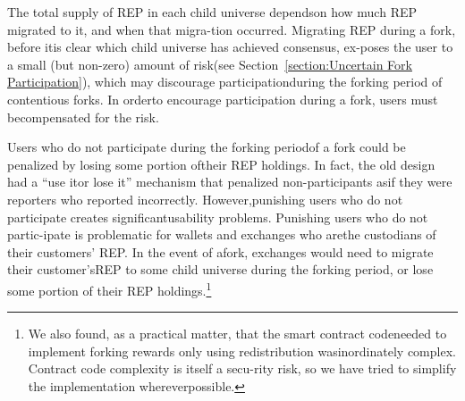 \documentclass[12pt,floatfix,reprint,nofootinbib,amsmath,amssymb,epsfig,pre,floats,letterpaper,groupedaffiliation]{revtex4-1}
\theoremstyle{definition}
\theoremstyle{definition}
\begin{document}
The total supply of REP in each child universe depends\linebreak on how much REP migrated to it, and when that migra-\linebreak tion occurred. Migrating REP during a fork, before it\linebreak is clear which child universe has achieved consensus, ex-\linebreak poses the user to a small (but non-zero) amount of risk\linebreak (see Section~\ref{section:Uncertain Fork Participation}), which may discourage participation\linebreak during the forking period of contentious forks. In order\linebreak to encourage participation during a fork, users must be\linebreak compensated for the risk.

Users who do not participate during the forking period\linebreak of a fork could be penalized by losing some portion of\linebreak their REP holdings. In fact, the old design had a ``use it\linebreak or lose it'' mechanism that penalized non-participants as\linebreak if they were reporters who reported incorrectly. However,\linebreak punishing users who do not participate creates significant\linebreak usability problems. Punishing users who do not partic-\linebreak ipate is problematic for wallets and exchanges who are\linebreak the custodians of their customers' REP. In the event of a\linebreak fork, exchanges would need to migrate their customer's\linebreak \enlargethispage*{1\baselineskip}REP to some child universe during the forking period, or \linebreak lose some portion of their REP holdings.\footnote{We also found, as a practical matter, that the smart contract code\linebreak needed to implement forking rewards only using redistribution was\linebreak inordinately complex. Contract code complexity is itself a secu-\linebreak rity risk, so we have tried to simplify the implementation wherever\linebreak possible.}
\end{document}
